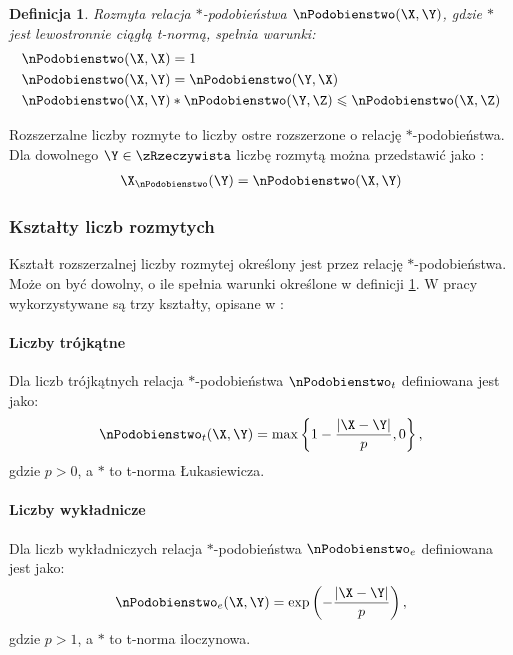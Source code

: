 \documentclass[a4paper,twoside,12pt]{book}
\newtheorem{Definition}{Definicja}
\begin{document}
\begin{Definition}
\label{def:fuzzy-similarity}
	\cite{bib:arithmetics-extensional-fuzzy-numbers} Rozmyta relacja $\ast$-podobieństwa $\nPodobienstwo(\X,\Y)$, gdzie $\ast$ jest lewostronnie ciągłą t-normą, spełnia warunki:
	\begin{align}
		\nPodobienstwo(\X,\X) & = 1 \\
		\nPodobienstwo(\X,\Y) & = \nPodobienstwo(\Y,\X)\\
		\nPodobienstwo(\X,\Y) & \ast \nPodobienstwo(\Y,\Z) \leqslant \nPodobienstwo(\X,\Z)
	\end{align}
\end{Definition}

Rozszerzalne liczby rozmyte to liczby ostre rozszerzone o relację $\ast$-podobieństwa. Dla dowolnego $\Y \in \zRzeczywista$ liczbę rozmytą można przedstawić jako \cite{bib:arithmetics-extensional-fuzzy-numbers}:
\begin{align}
	\X_{\nPodobienstwo}(\Y) = \nPodobienstwo(\X, \Y)
\end{align}

\subsubsection{Kształty liczb rozmytych}
\label{sec:ksztalty-liczb-rozmytych}

Kształt rozszerzalnej liczby rozmytej określony jest przez relację $\ast$-podobieństwa. Może on być dowolny, o ile spełnia warunki określone w definicji \ref{def:fuzzy-similarity}. W pracy wykorzystywane są trzy kształty, opisane w \cite{bib:fuzzy-numbers-revisited-logic-operations}:

\paragraph{Liczby trójkątne}

Dla liczb trójkątnych relacja $\ast$-podobieństwa $\nPodobienstwo_{t}$ definiowana jest jako:
\begin{align}
	\nPodobienstwo_{t}(\X,\Y) = \max \left\{1 - \frac{|\X-\Y|}{p}, 0 \right\},
\end{align}
gdzie $p > 0$, a $\ast$ to t-norma Łukasiewicza.

\paragraph{Liczby wykładnicze}

Dla liczb wykładniczych relacja $\ast$-podobieństwa $\nPodobienstwo_{e}$ definiowana jest jako:
\begin{align}
	\nPodobienstwo_{e}(\X,\Y) = \exp \left(- \frac{|\X-\Y|}{p} \right),
\end{align}
gdzie $p > 1$, a $\ast$ to t-norma iloczynowa.
\end{document}
